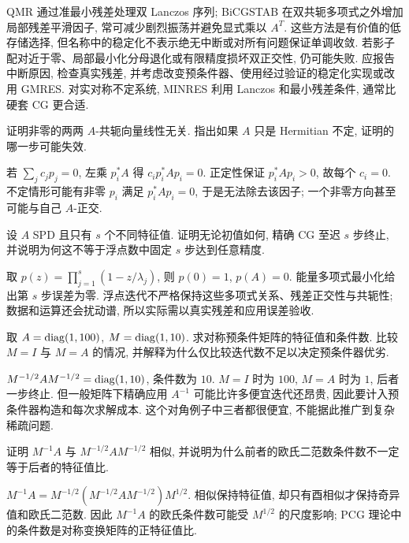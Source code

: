 QMR 通过准最小残差处理双 Lanczos 序列; BiCGSTAB 在双共轭多项式之外增加局部残差平滑因子, 常可减少剧烈振荡并避免显式乘以 $A^T$. 这些方法是有价值的低存储选择, 但名称中的稳定化不表示绝无中断或对所有问题保证单调收敛. 若影子配对近于零、局部最小化分母退化或有限精度损坏双正交性, 仍可能失败. 应报告中断原因, 检查真实残差, 并考虑改变预条件器、使用经过验证的稳定化实现或改用 GMRES. 对实对称不定系统, MINRES 利用 Lanczos 和最小残差条件, 通常比硬套 CG 更合适.

\begin{exercise}
证明非零的两两 $A$-共轭向量线性无关. 指出如果 $A$ 只是 Hermitian 不定, 证明的哪一步可能失效.
\end{exercise}
\begin{solution}
若 $\sum_jc_jp_j=0$, 左乘 $p_i^*A$ 得 $c_ip_i^*Ap_i=0$. 正定性保证 $p_i^*Ap_i>0$, 故每个 $c_i=0$. 不定情形可能有非零 $p_i$ 满足 $p_i^*Ap_i=0$, 于是无法除去该因子; 一个非零方向甚至可能与自己 $A$-正交.
\end{solution}
\begin{exercise}
设 $A$ SPD 且只有 $s$ 个不同特征值. 证明无论初值如何, 精确 CG 至迟 $s$ 步终止, 并说明为何这不等于浮点数中固定 $s$ 步达到任意精度.
\end{exercise}
\begin{solution}
取 $p(z)=\prod_{j=1}^s(1-z/\lambda_j)$, 则 $p(0)=1$, $p(A)=0$. 能量多项式最小化给出第 $s$ 步误差为零. 浮点迭代不严格保持这些多项式关系、残差正交性与共轭性; 数据和运算还会扰动谱, 所以实际需以真实残差和应用误差验收.
\end{solution}
\begin{exercise}
取 $A=\operatorname{diag}(1,100)$, $M=\operatorname{diag}(1,10)$. 求对称预条件矩阵的特征值和条件数. 比较 $M=I$ 与 $M=A$ 的情况, 并解释为什么仅比较迭代数不足以决定预条件器优劣.
\end{exercise}
\begin{solution}
$M^{-1/2}AM^{-1/2}=\operatorname{diag}(1,10)$, 条件数为 $10$. $M=I$ 时为 $100$, $M=A$ 时为 $1$, 后者一步终止. 但一般矩阵下精确应用 $A^{-1}$ 可能比许多便宜迭代还昂贵, 因此要计入预条件器构造和每次求解成本. 这个对角例子中三者都很便宜, 不能据此推广到复杂稀疏问题.
\end{solution}
\begin{exercise}
证明 $M^{-1}A$ 与 $M^{-1/2}AM^{-1/2}$ 相似, 并说明为什么前者的欧氏二范数条件数不一定等于后者的特征值比.
\end{exercise}
\begin{solution}
$M^{-1}A=M^{-1/2}(M^{-1/2}AM^{-1/2})M^{1/2}$. 相似保持特征值, 却只有酉相似才保持奇异值和欧氏二范数. 因此 $M^{-1}A$ 的欧氏条件数可能受 $M^{1/2}$ 的尺度影响; PCG 理论中的条件数是对称变换矩阵的正特征值比.
\end{solution}
